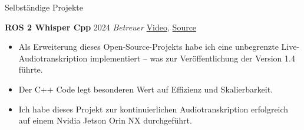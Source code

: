 \begin{rubric}{Selbständige Projekte}

\entry*[] \textbf{ROS 2 Whisper Cpp} \hfill 2024 \newline 
\emph{Betreuer} \hfill \href{https://github.com/ros-ai/ros2_whisper/blob/main/doc/harry_potter_sample.gif}{Video}, \href{https://github.com/ros-ai/ros2_whisper}{\faGithub Source} \newline  
\vspace{\CVItemizeHeaderSpacing} \begin{itemize}[leftmargin=*, rightmargin=1cm]
	\setlength{\itemsep}{\CVItemizeSpacing}
	\item Als Erweiterung dieses Open-Source-Projekts habe ich eine unbegrenzte Live-Audiotranskription implementiert -- was zur Veröffentlichung der Version 1.4 führte. 
	\item Der C++ Code legt besonderen Wert auf Effizienz und Skalierbarkeit.
	\item Ich habe dieses Projekt zur kontinuierlichen Audiotranskription erfolgreich auf einem Nvidia Jetson Orin NX durchgeführt.
\end{itemize}  
\begin{comment}
\entry*[] \textbf{ROS 2 Computer Vision} \hfill 2024 \newline \emph{Autor} \hfill \href{https://github.com/NathanCorral/ROS-HF-Vision/blob/main/doc/gifs/ex_german_roads.gif}{Video}, \href{https://github.com/NathanCorral/ROS-HF-Vision/tree/main}{\faGithub Source} \newline  
\vspace{\CVItemizeHeaderSpacing} \begin{itemize}[leftmargin=*, rightmargin=1cm] 
	\setlength{\itemsep}{\CVItemizeSpacing}  
	\item Dieses Projekt implementiert Computer-Vision (CV) Aufgaben (Objekterkennung, Maskenbeschriftung pro Pixel) als parallele ROS 2-Knoten.
	\item Modernste CV Modellen (wie DETR und Maskformer) sind von Hugging Face ~~~~~~~~~~~~ automatisch heruntergeladen.
	\item Die Ergebnisse der CV Modellen, die auf verschiedenen Datensätzen trainiert  ~~~~~~~~~~~~~~ worden sein können, werden von einem globalen Server in einen universellen ~~~~~~~~~~~~~~ Index umgewandelt.  
	\item Diese Pipeline wird entweder auf eine Live-Kameraübertragung oder auf Bilder aus einem vorab trainierten Datensatz angewandt, wobei die Ergebnisse in Echtzeit angezeigt werden, um die durch die Modellwahl verursachte unterschiedliche Verzögerung zu verdeutlichen.
\end{itemize}  


\end{comment}
\end{rubric}

